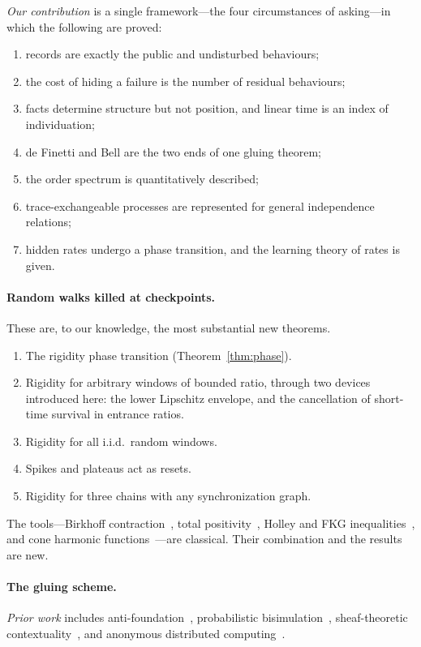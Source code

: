 \documentclass[11pt]{article}
\theoremstyle{definition}
\theoremstyle{remark}
\begin{document}
\noindent \emph{Our contribution} is a single framework---the four circumstances of asking---in which the following are proved:
\begin{enumerate}
\item records are exactly the public and undisturbed behaviours;
\item the cost of hiding a failure is the number of residual behaviours;
\item facts determine structure but not position, and linear time is an index of individuation;
\item de Finetti and Bell are the two ends of one gluing theorem;
\item the order spectrum is quantitatively described;
\item trace-exchangeable processes are represented for general independence relations;
\item hidden rates undergo a phase transition, and the learning theory of rates is given.
\end{enumerate}

\paragraph{Random walks killed at checkpoints.} These are, to our knowledge, the most substantial new theorems.
\begin{enumerate}
\item The rigidity phase transition (Theorem~\ref{thm:phase}).
\item Rigidity for arbitrary windows of bounded ratio, through two devices introduced here: the lower Lipschitz envelope, and the cancellation of short-time survival in entrance ratios.
\item Rigidity for all i.i.d.\ random windows.
\item Spikes and plateaus act as resets.
\item Rigidity for three chains with any synchronization graph.
\end{enumerate}
The tools---Birkhoff contraction~\cite{Birkhoff57}, total positivity~\cite{KarlinRinott80}, Holley and FKG inequalities~\cite{Holley74,FKG71}, and cone harmonic functions~\cite{DenisovWachtel15,KOR02}---are classical. Their combination and the results are new.

\paragraph{The gluing scheme.}
\emph{Prior work} includes anti-foundation~\cite{Aczel88}, probabilistic bisimulation~\cite{LarsenSkou91}, sheaf-theoretic contextuality~\cite{Abramsky11}, and anonymous distributed computing~\cite{Angluin80,YamashitaKameda96,Hella15}.
\end{document}
